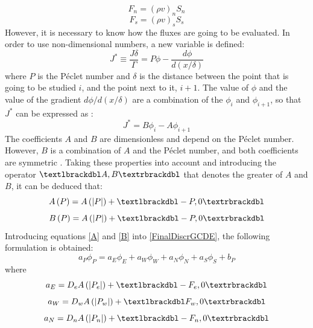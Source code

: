 \begin{equation}
F_{n}=\left(\rho v\right)_{n}S_{n}
\end{equation}
\begin{equation}
F_{s}=\left(\rho v\right)_{s}S_{s}
\end{equation}
However, it is necessary to know how the fluxes are going to be evaluated. In order to use non-dimensional numbers, a new variable is defined:
\begin{equation}
	J^{*}\equiv\frac{J\delta}{\Gamma}=P\phi-\frac{d\phi}{d\left(x/\delta\right)}
\end{equation}
where $P$ is the Péclet number and $\delta$ is the distance between the point that is going to be studied $i$, and the point next to it, $i+1$. The value of $\phi$ and the value of the gradient $d\phi/d\left(x/\delta\right)$ are a combination of the $\phi_{i}$ and $\phi_{i+1}$, so that $J^{*}$ can be expressed as \cite{Patankar1980}:
\begin{equation}
J^{*}=B\phi_{i}-A\phi_{i+1}
\end{equation}
The coefficients $A$ and $B$ are dimensionless and depend on the Péclet number. However, $B$ is a combination of $A$ and the Péclet number, and both coefficients are symmetric \cite{Patankar1980}. Taking these properties into account and introducing the operator $\textlbrackdbl A,B\textrbrackdbl$ that denotes the greater of $A$ and $B$, it can be deduced that:
\begin{equation}
A\left(P\right)=A\left(|P|\right)+\textlbrackdbl-P,0\textrbrackdbl
\label{A}
\end{equation}
\begin{equation}
B\left(P\right)=A\left(|P|\right)+\textlbrackdbl-P,0\textrbrackdbl
\label{B}
\end{equation}
Introducing equations \ref{A} and \ref{B} into \ref{FinalDiscrGCDE}, the following formulation is obtained:
\begin{equation}
	a_{P}\phi_{P}=a_{E}\phi_{E}+a_{W}\phi_{W}+a_{N}\phi_{N}+a_{S}\phi_{S}+b_{P}
\end{equation}
where
\begin{equation}
a_{E}=D_{e}A\left(|P_{e}|\right)+\textlbrackdbl-F_{e},0\textrbrackdbl
\end{equation}
\begin{equation}
a_{W}=D_{w}A\left(|P_{w}|\right)+\textlbrackdbl F_{w},0\textrbrackdbl
\end{equation}
\begin{equation}
a_{N}=D_{n}A\left(|P_{n}|\right)+\textlbrackdbl-F_{n},0\textrbrackdbl
\end{equation}
